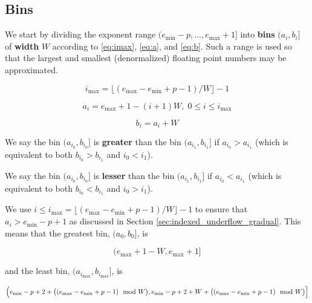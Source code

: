 \documentclass[12pt]{article}
\providecommand{\min}{\ensuremath{\text{min}}}
\providecommand{\max}{\ensuremath{\text{max}}}
\theoremstyle{definition}
\numberwithin{equation}{section}
\numberwithin{figure}{section}
\begin{document}
  \subsection{Bins}
    \label{sec:binning_bins}
    We start by dividing the exponent range $(e_{\min} - p, ..., e_{\max} + 1]$  into \textbf{bins} $(a_i, b_i]$ of \textbf{width} $W$ according to \eqref{eq:imax}, \eqref{eq:a}, and \eqref{eq:b}. Such a range is used so that the largest and smallest (denormalized) floating point numbers may be approximated.

    \begin{equation}
      i_{\max} = \bigl\lfloor(e_{\max} - e_{\min} + p - 1)/W\bigr\rfloor - 1
      \label{eq:imax}
    \end{equation}

    \begin{equation}
      a_i = e_{\max} + 1 - (i + 1)W,\; 0 \leq i \leq i_{\max}
      \label{eq:a}
    \end{equation}

    \begin{equation}
      b_i = a_i + W
      \label{eq:b}
    \end{equation}

    We say the bin $(a_{i_0}, b_{i_0}]$ is \textbf{greater} than the bin $(a_{i_1}, b_{i_1}]$ if $a_{i_0} > a_{i_1}$ (which is equivalent to both $b_{i_0} > b_{i_1}$ and $i_0 < i_1$).

    We say the bin $(a_{i_0}, b_{i_0}]$ is \textbf{lesser} than the bin $(a_{i_1}, b_{i_1}]$ if $a_{i_0} < a_{i_1}$ (which is equivalent to both $b_{i_0} < b_{i_1}$ and $i_0 > i_1$).

    We use $i \leq i_{\max} = \lfloor(e_{\max} - e_{\min} + p - 1)/W\rfloor - 1$ to ensure that $a_i > e_{\min} - p + 1$ as discussed in Section \ref{sec:indexed_underflow_gradual}. This means that the greatest bin, $(a_{0}, b_{0}]$, is

    \begin{equation}
      (e_{\max} + 1 - W, e_{\max} + 1]
      \label{eq:binmax}
    \end{equation}

    and the least bin, $(a_{i_{\max}}, b_{i_{\max}}]$, is

    \begin{equation}
      \Bigl(e_{\min} - p + 2 + \bigl((e_{\max} - e_{\min} + p - 1)\mod W\bigr),
      e_{\min} - p + 2 + W + \bigl((e_{\max} - e_{\min} + p - 1)\mod W\bigr)\Bigr]
      \label{eq:binmin}
    \end{equation}
\end{document}
